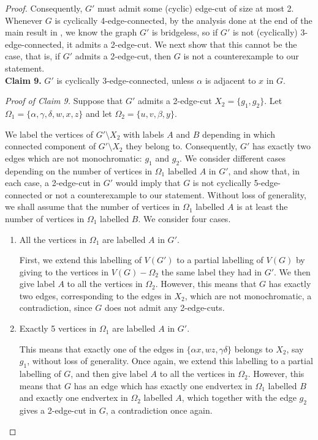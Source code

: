 \documentclass[]{theclass}
\begin{document}
\begin{proof}
Consequently, $G'$ must admit some (cyclic) edge-cut of size at most 2. Whenever $G$ is cyclically 4-edge-connected, by the analysis done at the end of the main result in \cite{quelling1}, we know the graph $G'$ is bridgeless, so if $G'$ is not (cyclically) 3-edge-connected, it admits a 2-edge-cut.
We next show that this cannot be the case, that is, if $G'$ admits a 2-edge-cut, then $G$ is not a counterexample to our statement.\\

\noindent\textbf{Claim 9.} $G'$ is cyclically 3-edge-connected, unless $\alpha$ is adjacent to $x$ in $G$.

\noindent\emph{Proof of Claim 9.}  Suppose that $G'$ admits a 2-edge-cut $X_2=\{g_1,g_2\}$. Let $\Omega_{1}=\{\alpha, \gamma,\delta, w,x,z\}$ and let $\Omega_{2}=\{u,v,\beta, y\}$.

We label the vertices of $G'\setminus X_2$ with labels $A$ and $B$ depending in which connected component of $G'\setminus X_2$ they belong to.
 Consequently, $G'$ has exactly two edges which are not monochromatic: $g_1$ and $g_2$. We consider different cases depending on the number of vertices in $\Omega_{1}$ labelled $A$ in $G'$, and show that, in each case, a 2-edge-cut in $G'$ would imply that $G$ is not cyclically 5-edge-connected or not a counterexample to our statement.  Without loss of generality, we shall assume that the number of vertices in $\Omega_{1}$ labelled $A$ is at least the number of vertices in $\Omega_{1}$ labelled $B$. We consider four cases.

\begin{enumerate}[label=(B\arabic*), start=0]
\item All the vertices in $\Omega_{1}$ are labelled $A$ in $G'$.

First, we extend this labelling of $V(G')$ to a partial labelling of $V(G)$ by giving to the vertices in $V(G)-\Omega_{2}$ the same label they had in $G'$. We then give label $A$ to all the vertices in $\Omega_{2}$. However, this means that $G$ has exactly two edges, corresponding to the edges in $X_2$, which are not monochromatic, a contradiction, since $G$ does not admit any 2-edge-cuts.
 
\item Exactly 5 vertices in $\Omega_{1}$ are labelled $A$ in $G'$.

This means that exactly one of the edges in $\{\alpha x, wz, \gamma\delta\}$ belongs to $X_2$, say $g_1$, without loss of generality. Once again, we extend this labelling to a partial labelling of $G$, and then give label $A$ to all the vertices in $\Omega_{2}$. However, this means that $G$ has an edge which has exactly one endvertex in $\Omega_{1}$ labelled $B$ and exactly one endvertex in $\Omega_{2}$ labelled $A$, which together with the edge $g_2$ gives a 2-edge-cut in $G$, a contradiction once again. 


\end{enumerate}
\end{proof}
\end{document}

